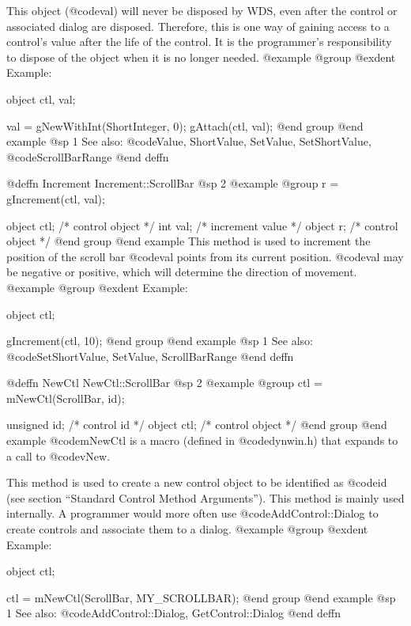 {This object (@code{val}) will never be disposed by WDS, even after
the control or associated dialog are disposed.  Therefore, this
is one way of gaining access to a control's value after the life
of the control.  It is the programmer's responsibility to dispose of
the object when it is no longer needed.
@example
@group
@exdent Example:

object  ctl, val;

val = gNewWithInt(ShortInteger, 0);
gAttach(ctl, val);
@end group
@end example
@sp 1
See also:  @code{Value, ShortValue, SetValue, SetShortValue,}
        @code{ScrollBarRange}
@end deffn










@deffn {Increment} Increment::ScrollBar
@sp 2
@example
@group
r = gIncrement(ctl, val);

object  ctl;   /*  control object  */
int     val;   /*  increment value */
object  r;     /*  control object  */
@end group
@end example
This method is used to increment the position of the scroll bar
@code{val} points from its current position.  @code{val} may
be negative or positive, which will determine the direction of movement.
@example
@group
@exdent Example:

object  ctl;

gIncrement(ctl, 10);
@end group
@end example
@sp 1
See also:  @code{SetShortValue, SetValue, ScrollBarRange}
@end deffn











@deffn {NewCtl} NewCtl::ScrollBar
@sp 2
@example
@group
ctl = mNewCtl(ScrollBar, id);

unsigned  id;   /*  control id      */
object   ctl;   /*  control object  */
@end group
@end example
@code{mNewCtl} is a macro (defined in @code{dynwin.h}) that expands to
a call to @code{vNew}.

This method is used to create a new control object to be identified as
@code{id} (see section ``Standard Control Method Arguments'').  This
method is mainly used internally.  A programmer would more often
use @code{AddControl::Dialog} to create controls and associate them
to a dialog.
@example
@group
@exdent Example:

object  ctl;

ctl = mNewCtl(ScrollBar, MY_SCROLLBAR);
@end group
@end example
@sp 1
See also:  @code{AddControl::Dialog, GetControl::Dialog}
@end deffn






}
